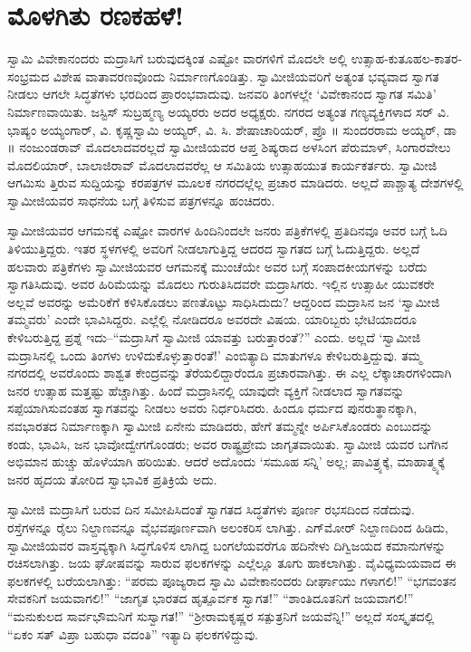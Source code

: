 
\chapter{ಮೊಳಗಿತು ರಣಕಹಳೆ!}

\noindent

ಸ್ವಾಮಿ ವಿವೇಕಾನಂದರು ಮದ್ರಾಸಿಗೆ ಬರುವುದಕ್ಕಿಂತ ಎಷ್ಟೋ ವಾರಗಳಿಗೆ ಮೊದಲೇ ಅಲ್ಲಿ ಉತ್ಸಾಹ-ಕುತೂಹಲ-ಕಾತರ-ಸಂಭ್ರಮದ ವಿಶೇಷ ವಾತಾವರಣವೊಂದು ನಿರ್ಮಾಣಗೊಂಡಿತ್ತು. ಸ್ವಾಮೀಜಿಯವರಿಗೆ ಅತ್ಯಂತ ಭವ್ಯವಾದ ಸ್ವಾಗತ ನೀಡಲು ಆಗಲೇ ಸಿದ್ಧತೆಗಳು ಭರದಿಂದ ಪ್ರಾರಂಭವಾದುವು. ಜನವರಿ ತಿಂಗಳಲ್ಲೇ ‘ವಿವೇಕಾನಂದ ಸ್ವಾಗತ ಸಮಿತಿ’ ನಿರ್ಮಾಣವಾಯಿತು. ಜಸ್ಟಿಸ್ ಸುಬ್ರಹ್ಮಣ್ಯ ಅಯ್ಯರರು ಅದರ ಅಧ್ಯಕ್ಷರು. ನಗರದ ಅತ್ಯಂತ ಗಣ್ಯವ್ಯಕ್ತಿಗಳಾದ ಸರ್ ವಿ. ಭಾಷ್ಯಂ ಅಯ್ಯಂಗಾರ್, ವಿ. ಕೃಷ್ಣಸ್ವಾಮಿ ಅಯ್ಯರ್, ವಿ. ಸಿ. ಶೇಷಾಚಾರಿಯರ್, ಪ್ರೊ ॥ ಸುಂದರರಾಮ ಅಯ್ಯರ್, ಡಾ ॥ ನಂಜುಂಡರಾವ್ ಮೊದಲಾದವರಲ್ಲದೆ ಸ್ವಾಮೀಜಿಯವರ ಆಪ್ತ ಶಿಷ್ಯರಾದ ಅಳಸಿಂಗ ಪೆರುಮಾಳ್, ಸಿಂಗಾರವೇಲು ಮೊದಲಿಯಾರ್, ಬಾಲಾಜಿರಾವ್ ಮೊದಲಾದವರೆಲ್ಲ ಆ ಸಮಿತಿಯ ಉತ್ಸಾಹಯುತ ಕಾರ್ಯಕರ್ತರು. ಸ್ವಾಮೀಜಿ ಆಗಮಿಸು ತ್ತಿರುವ ಸುದ್ದಿಯನ್ನು ಕರಪತ್ರಗಳ ಮೂಲಕ ನಗರದಲ್ಲೆಲ್ಲ ಪ್ರಚಾರ ಮಾಡಿದರು. ಅಲ್ಲದೆ ಪಾಶ್ಚಾತ್ಯ ದೇಶಗಳಲ್ಲಿ ಸ್ವಾಮೀಜಿಯವರ ಸಾಧನೆಯ ಬಗ್ಗೆ ತಿಳಿಸುವ ಪತ್ರಗಳನ್ನೂ ಹಂಚಿದರು.

ಸ್ವಾಮೀಜಿಯವರ ಆಗಮನಕ್ಕೆ ಎಷ್ಟೋ ವಾರಗಳ ಹಿಂದಿನಿಂದಲೇ ಜನರು ಪತ್ರಿಕೆಗಳಲ್ಲಿ ಪ್ರತಿದಿನವೂ ಅವರ ಬಗ್ಗೆ ಓದಿ ತಿಳಿಯುತ್ತಿದ್ದರು. ಇತರ ಸ್ಥಳಗಳಲ್ಲಿ ಅವರಿಗೆ ನೀಡಲಾಗುತ್ತಿದ್ದ ಆದರದ ಸ್ವಾಗತದ ಬಗ್ಗೆ ಓದುತ್ತಿದ್ದರು. ಅಲ್ಲದೆ ಹಲವಾರು ಪತ್ರಿಕೆಗಳು ಸ್ವಾಮೀಜಿಯವರ ಆಗಮನಕ್ಕೆ ಮುಂಚೆಯೇ ಅವರ ಬಗ್ಗೆ ಸಂಪಾದಕೀಯಗಳನ್ನು ಬರೆದು ಸ್ವಾಗತಿಸಿದುವು. ಅವರ ಹಿರಿಮೆಯನ್ನು ಮೊದಲು ಗುರುತಿಸಿದವರೇ ಮದ್ರಾಸಿಗರು. ಇಲ್ಲಿನ ಉತ್ಸಾಹೀ ಯುವಕರೇ ಅಲ್ಲವೆ ಅವರನ್ನು ಅಮೆರಿಕೆಗೆ ಕಳಿಸಿಕೊಡಲು ಪಣತೊಟ್ಟು ಸಾಧಿಸಿದುದು? ಆದ್ದರಿಂದ ಮದ್ರಾಸಿನ ಜನ ‘ಸ್ವಾಮೀಜಿ ತಮ್ಮವರು’ ಎಂದೇ ಭಾವಿಸಿದ್ದರು. ಎಲ್ಲೆಲ್ಲಿ ನೋಡಿದರೂ ಅವರದೇ ವಿಷಯ. ಯಾರಿಬ್ಬರು ಭೇಟಿಯಾದರೂ ಕೇಳಿಬರುತ್ತಿದ್ದ ಪ್ರಶ್ನೆ ಇದು–“ಮದ್ರಾಸಿಗೆ ಸ್ವಾಮೀಜಿ ಯಾವತ್ತು ಬರುತ್ತಾರಂತೆ?” ಎಂದು. ಅಲ್ಲದೆ ‘ಸ್ವಾಮೀಜಿ ಮದ್ರಾಸಿನಲ್ಲಿ ಒಂದು ತಿಂಗಳು ಉಳಿದುಕೊಳ್ಳುತ್ತಾರಂತೆ!’ ಎಂಬಿತ್ಯಾದಿ ಮಾತುಗಳೂ ಕೇಳಿಬರುತ್ತಿದ್ದುವು. ತಮ್ಮ ನಗರದಲ್ಲಿ ಅವರೊಂದು ಶಾಶ್ವತ ಕೇಂದ್ರವನ್ನು ತೆರೆಯಲಿದ್ದಾರೆಂದೂ ಪ್ರಚಾರವಾಗಿತ್ತು. ಈ ಎಲ್ಲ ಲೆಕ್ಕಾಚಾರಗಳಿಂದಾಗಿ ಜನರ ಉತ್ಸಾಹ ಮತ್ತಷ್ಟು ಹೆಚ್ಚಾಗಿತ್ತು. ಹಿಂದೆ ಮದ್ರಾಸಿನಲ್ಲಿ ಯಾವುದೇ ವ್ಯಕ್ತಿಗೆ ನೀಡಲಾದ ಸ್ವಾಗತವನ್ನು ಸಪ್ಪೆಯಾಗಿಸುವಂತಹ ಸ್ವಾಗತವನ್ನು ನೀಡಲು ಅವರು ನಿರ್ಧರಿಸಿದರು. ಹಿಂದೂ ಧರ್ಮದ ಪುನರುತ್ಥಾನಕ್ಕಾಗಿ, ನವಭಾರತದ ನಿರ್ಮಾಣಕ್ಕಾಗಿ ಸ್ವಾಮೀಜಿ ಏನೇನು ಮಾಡಿದರು, ಹೇಗೆ ತಮ್ಮನ್ನೇ ಅರ್ಪಿಸಿಕೊಂಡರು ಎಂಬುದನ್ನು ಕಂಡು, ಭಾವಿಸಿ, ಜನ ಭಾವೋದ್ವೇಗಗೊಂಡರು; ಅವರ ರಾಷ್ಟ್ರಪ್ರೇಮ ಜಾಗೃತವಾಯಿತು. ಸ್ವಾಮೀಜಿ ಯವರ ಬಗೆಗಿನ ಅಭಿಮಾನ ಹುಚ್ಚು ಹೊಳೆಯಾಗಿ ಹರಿಯಿತು. ಆದರೆ ಅದೊಂದು ‘ಸಮೂಹ ಸನ್ನಿ’ ಅಲ್ಲ; ಪಾವಿತ್ರ್ಯಕ್ಕೆ, ಮಾಹಾತ್ಮ್ಯಕ್ಕೆ ಜನರ ಹೃದಯ ತೋರಿದ ಸ್ವಾಭಾವಿಕ ಪ್ರತಿಕ್ರಿಯೆ ಅದು.

ಸ್ವಾಮೀಜಿ ಮದ್ರಾಸಿಗೆ ಬರುವ ದಿನ ಸಮೀಪಿಸಿದಂತೆ ಸ್ವಾಗತದ ಸಿದ್ಧತೆಗಳು ಪೂರ್ಣ ರಭಸದಿಂದ ನಡೆದುವು. ರಸ್ತೆಗಳನ್ನೂ ರೈಲು ನಿಲ್ದಾಣವನ್ನೂ ವೈಭವಪೂರ್ಣವಾಗಿ ಅಲಂಕರಿಸ ಲಾಗಿತ್ತು. ಎಗ್​ಮೋರ್ ನಿಲ್ದಾಣದಿಂದ ಹಿಡಿದು, ಸ್ವಾಮೀಜಿಯವರ ವಾಸ್ತವ್ಯಕ್ಕಾಗಿ ಸಿದ್ಧಗೊಳಿಸ ಲಾಗಿದ್ದ ಬಂಗಲೆಯವರೆಗೂ ಹದಿನೇಳು ದಿಗ್ವಿಜಯದ ಕಮಾನುಗಳನ್ನು ರಚಿಸಲಾಗಿತ್ತು. ಜಯ ಘೋಷವನ್ನು ಸಾರುವ ಫಲಕಗಳನ್ನು ಎಲ್ಲೆಲ್ಲೂ ತೂಗು ಹಾಕಲಾಗಿತ್ತು. ವೈವಿಧ್ಯಮಯವಾದ ಈ ಫಲಕಗಳಲ್ಲಿ ಬರೆಯಲಾಗಿತ್ತು: “ಪರಮ ಪೂಜ್ಯರಾದ ಸ್ವಾಮಿ ವಿವೇಕಾನಂದರು ದೀರ್ಘಾಯು ಗಳಾಗಲಿ!” “ಭಗವಂತನ ಸೇವಕನಿಗೆ ಜಯವಾಗಲಿ!” “ಜಾಗೃತ ಭಾರತದ ಹೃತ್ಪೂರ್ವಕ ಸ್ವಾಗತ!” “ಶಾಂತಿದೂತನಿಗೆ ಜಯವಾಗಲಿ!” “ಮನುಕುಲದ ಸಾರ್ವಭೌಮನಿಗೆ ಸುಸ್ವಾಗತ!” “ಶ್ರೀರಾಮಕೃಷ್ಣರ ಸತ್ಪುತ್ರನಿಗೆ ಜಯವೆನ್ನಿ!” ಅಲ್ಲದೆ ಸಂಸ್ಕೃತದಲ್ಲಿ “ಏಕಂ ಸತ್ ವಿಪ್ರಾ ಬಹುಧಾ ವದಂತಿ” ಇತ್ಯಾದಿ ಫಲಕಗಳಿದ್ದುವು.

